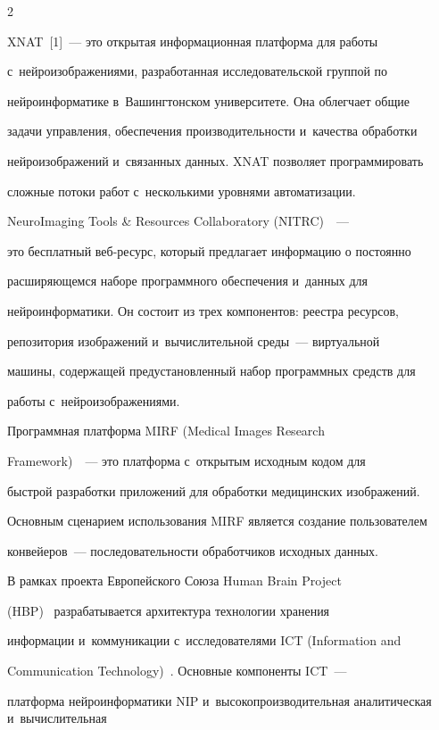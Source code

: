\begin{multicols}{2}
    

    XNAT~[1]~--- это открытая информационная платформа для работы 

с~нейроизображениями, разработанная исследовательской группой по 

нейроинформатике в~Вашингтонском университете. Она облегчает общие 

задачи управления, обеспечения производительности и~качества обработки 

нейроизображений и~связанных данных. XNAT позволяет программировать 

сложные потоки работ с~несколькими уровнями автоматизации.

    

    NeuroImaging Tools \& Resources Collaboratory (NITRC)~\cite{2-st}~---  

это бесплатный веб-ре\-сурс, который предлагает информацию о постоянно 

расширяющемся наборе программного обеспечения и~данных для 

нейроинформатики. Он состоит из трех компонентов: реестра ресурсов, 

репозитория изображений и~вычислительной среды~--- виртуальной 

машины, содержащей предустановленный набор программных средств для 

работы с~нейроизображениями.

    

    Программная платформа MIRF (Medical Images Research 

Framework)~\cite{4-st}~---  это платформа с~открытым исходным кодом для 

быстрой разработки приложений для обработки медицинских изображений. 

Основным сценарием использования MIRF является создание пользователем 

конвейеров~--- последовательности обработчиков исходных данных. 

    

    В рамках проекта Европейского Союза Human Brain Project 

(HBP)~\cite{5-st} разрабатывается архитектура технологии хранения 

информации и~коммуникации с~исследователями ICT (Information and 

Communication Technology)~\cite{3-st}. Основные компоненты ICT~--- 

платформа нейроинформатики NIP и~высокопроизводительная аналитическая и~вы\-чис\-ли\-тель\-ная 


\end{multicols}
